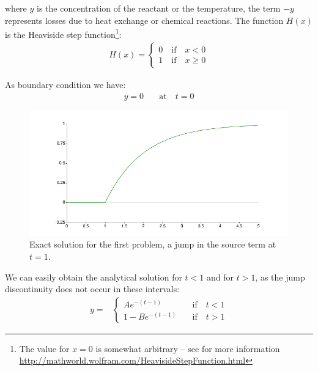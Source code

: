 \documentclass[onecolumn]{article}
\begin{document}
where $y$ is the concentration of the reactant or the temperature, the term $-y$ represents losses due to
heat exchange or chemical reactions. The function $H(x)$ is the Heaviside step function\footnote{The value for $x = 0$ is somewhat arbitrary -- see for more information \url{http://mathworld.wolfram.com/HeavisideStepFunction.html}}:
%
\begin{align}
              H(x) =
              \begin{cases}
              0 \quad \text{if} \quad x < 0     \\
\nonumber     1 \quad \text{if} \quad x \geq 0
              \end{cases}
\end{align}

As boundary condition we have:
%
\begin{align}
    y = 0 & \quad \text{at} \quad t = 0
\end{align}

\begin{figure}
\begin{center}
\includegraphics{jumpexact.pdf}
\caption{Exact solution for the first problem, a jump in the source term at $t = 1$.}
\label{solutionSourceOn}
\end{center}
\end{figure}

We can easily obtain the analytical solution for $t < 1$ and for $t > 1$, as the jump
discontinuity does not occur in these intervals:
%
\begin{align}
             y = &
             \begin{cases}
             A e^{-(t-1)}     & \quad \text{if} \quad t < 1 \\
             1 - B e^{-(t-1)} & \quad \text{if} \quad t > 1
             \end{cases}
\end{align}
\end{document}

